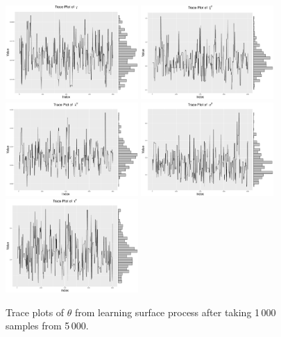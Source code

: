 \begin{figure}[h]
\centering
\includegraphics[width=0.45\textwidth]{Chapters/05MCMCOU/plots/realdatalearninggam.pdf}
\includegraphics[width=0.45\textwidth]{Chapters/05MCMCOU/plots/realdatalearningxi2.pdf}
\includegraphics[width=0.45\textwidth]{Chapters/05MCMCOU/plots/realdatalearninglab2.pdf}
\includegraphics[width=0.45\textwidth]{Chapters/05MCMCOU/plots/realdatalearningsig2.pdf}
\includegraphics[width=0.45\textwidth]{Chapters/05MCMCOU/plots/realdatalearningtau2.pdf}
\caption{Trace plots of $\theta$ from learning surface process after taking 1\,000 samples from 5\,000. }
\end{figure}


